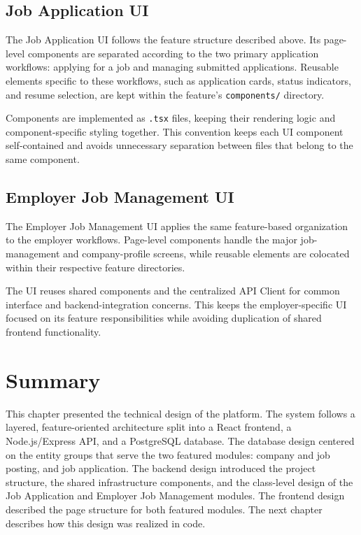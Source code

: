 \subsection{Job Application UI}
The Job Application UI follows the feature structure described above. Its page-level components are separated according to the two primary application workflows: applying for a job and managing submitted applications. Reusable elements specific to these workflows, such as application cards, status indicators, and resume selection, are kept within the feature's \texttt{components/} directory.

Components are implemented as \texttt{.tsx} files, keeping their rendering logic and component-specific styling together. This convention keeps each UI component self-contained and avoids unnecessary separation between files that belong to the same component.

\subsection{Employer Job Management UI}

The Employer Job Management UI applies the same feature-based organization to the employer workflows. Page-level components handle the major job-management and company-profile screens, while reusable elements are colocated within their respective feature directories.

The UI reuses shared components and the centralized API Client for common interface and backend-integration concerns. This keeps the employer-specific UI focused on its feature responsibilities while avoiding duplication of shared frontend functionality.

\section{Summary}
\label{c4:section:summary}

This chapter presented the technical design of the platform. The system follows a layered, feature-oriented architecture split into a React frontend, a Node.js/Express API, and a PostgreSQL database. The database design centered on the entity groups that serve the two featured modules: company and job posting, and job application. The backend design introduced the project structure, the shared infrastructure components, and the class-level design of the Job Application and Employer Job Management modules. The frontend design described the page structure for both featured modules. The next chapter describes how this design was realized in code.